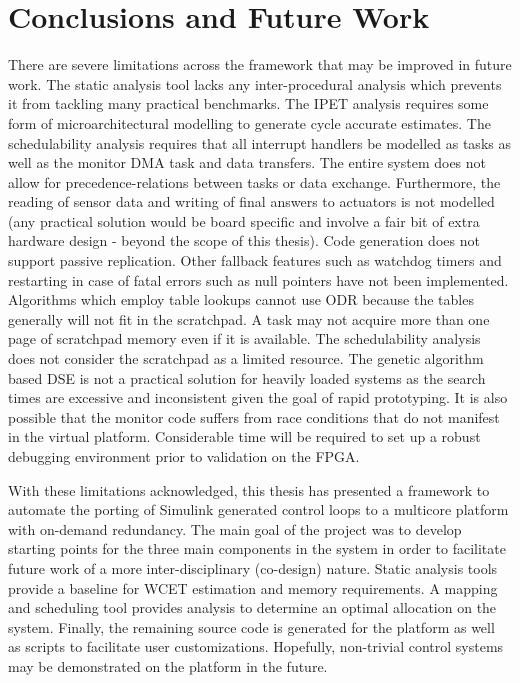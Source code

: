 
\chapter{Conclusions and Future Work} 

\label{c:concl} 

	There are severe limitations across the framework that may be improved in future work.
	The static analysis tool lacks any inter-procedural analysis which prevents it from tackling many practical benchmarks.
	The IPET analysis requires some form of microarchitectural modelling to generate cycle accurate estimates.
	The schedulability analysis requires that all interrupt handlers be modelled as tasks as well as the monitor DMA task and data transfers.
	The entire system does not allow for precedence-relations between tasks or data exchange. 
	Furthermore, the reading of sensor data and writing of final answers to actuators is not modelled (any practical solution would be board specific and involve a fair bit of extra hardware design - beyond the scope of this thesis).
	Code generation does not support passive replication.
	Other fallback features such as watchdog timers and restarting in case of fatal errors such as null pointers have not been implemented.
	Algorithms which employ table lookups cannot use ODR because the tables generally will not fit in the scratchpad.
	A task may not acquire more than one page of scratchpad memory even if it is available.
	The schedulability analysis does not consider the scratchpad as a limited resource.
	The genetic algorithm based DSE is not a practical solution for heavily loaded systems as the search times are excessive and inconsistent given the goal of rapid prototyping. 
	It is also possible that the monitor code suffers from race conditions that do not manifest in the virtual platform. 
	Considerable time will be required to set up a robust debugging environment prior to validation on the FPGA.
	


	With these limitations acknowledged, this thesis has presented a framework to automate the porting of Simulink generated control loops to a multicore platform with on-demand redundancy.
	The main goal of the project was to develop starting points for the three main components in the system in order to facilitate future work of a more inter-disciplinary (co-design) nature. 
	Static analysis tools provide a baseline for WCET estimation and memory requirements. 
	A mapping and scheduling tool provides analysis to determine an optimal allocation on the system.
	Finally, the remaining source code is generated for the platform as well as scripts to facilitate user customizations.
	Hopefully, non-trivial control systems may be demonstrated on the platform in the future.
		